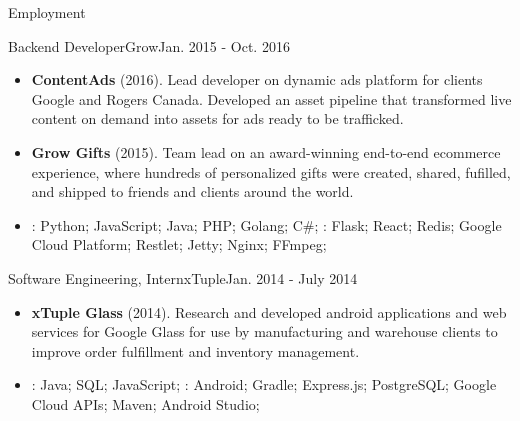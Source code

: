 \documentclass[]{mcdowellcv}
\begin{document}
\begin{cvsection}{Employment}
        \begin{cvsubsection}{Backend Developer}{Grow}{Jan. 2015 - Oct. 2016}
            \begin{itemize}
                \item \textbf{ContentAds} (2016). Lead developer on dynamic ads platform for clients Google and Rogers Canada. Developed an asset pipeline that transformed live content on demand into assets for ads ready to be trafficked.
            \end{itemize}
            \begin{itemize}
                \item \textbf{Grow Gifts} (2015). Team lead on an award-winning end-to-end ecommerce experience, where hundreds of personalized gifts were created, shared, fufilled, and shipped to friends and clients around the world.
            \end{itemize}
            \begin{itemize}
                 \item {}: Python; JavaScript; Java; PHP; Golang; C\#; \newline
                : Flask; React; Redis; Google Cloud Platform; Restlet; Jetty; Nginx; FFmpeg;
            \end{itemize}
        \end{cvsubsection}

        \begin{cvsubsection}{Software Engineering, Intern}{xTuple}{Jan. 2014 - July 2014}
            \begin{itemize}
                \item \textbf{xTuple Glass} (2014). Research and developed android applications and web services for Google Glass for use by manufacturing and warehouse clients to improve order fulfillment and inventory management.
            \end{itemize}
            \begin{itemize}
                 \item {}: Java; SQL; JavaScript; \newline
                : Android; Gradle; Express.js; PostgreSQL; Google Cloud APIs; Maven; Android Studio;
            \end{itemize}
        \end{cvsubsection}


\end{cvsection}
\end{document}
